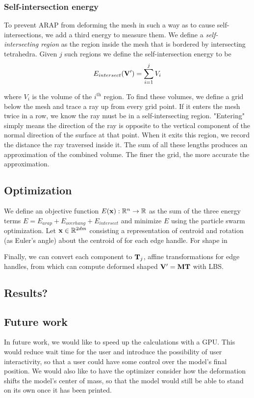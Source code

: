 \subsubsection*{Self-intersection energy}

To prevent ARAP from deforming the mesh in such a way as to cause self-intersections, we add a third energy to measure them. We define a \textit{self-intersecting region} as the region inside the mesh that is bordered by intersecting tetrahedra. Given $j$ such regions we define the self-intersection energy to be
\[
	E_{intersect}(\mathbf{V}') = \sum_{i=1}^j V_i
\]

where $V_i$ is the volume of the $i^{\text{th}}$ region. To find these volumes, we define a grid below the mesh and trace a ray up from every grid point. If it enters the mesh twice in a row, we know the ray must be in a self-intersecting region. "Entering" simply means the direction of the ray is opposite to the vertical component of the normal direction of the surface at that point. When it exits this region, we record the distance the ray traversed inside it. The sum of all these lengths produces an approximation of the combined volume. The finer the grid, the more accurate the approximation.


\subsection*{Optimization}

We define an objective function $E(\mathbf{x}): \mathbb{R}^n \rightarrow \mathbb{R}$ as the sum of the three energy terms $E = E_{arap} + E_{overhang} + E_{intersect}$
and minimize $E$ using the particle swarm optimization. Let $\mathbf{x} \in \mathbb{R}^{2dm}$ consisting a representation of centroid and rotation (as Euler's angle) about the centroid of for each edge handle. For shape in 

Finally, we can convert each component to $\mathbf{T}_j$, affine transformations for edge handles, from which can compute deformed shaped $\mathbf{V}' = \mathbf{M} \mathbf{T}$ with LBS.

\subsection*{Results?}

\subsection*{Future work}
In future work, we would like to speed up the calculations with a GPU. This would reduce wait time for the user and introduce the possibility of user interactivity, so that a user could have some control over the model's final position. We would also like to have the optimizer consider how the deformation shifts the model's center of mass, so that the model would still be able to stand on its own once it has been printed.